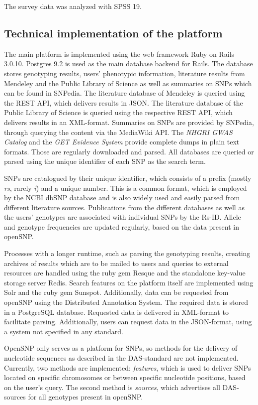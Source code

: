 \documentclass[10pt]{article}
\begin{document}
The survey data was analyzed with SPSS 19. 

\subsection*{Technical implementation of the platform}
The main platform is implemented using the web framework Ruby on Rails 3.0.10. Postgres 9.2 is used as the main database backend for Rails. 
The database stores genotyping results, users' phenotypic information, literature results from Mendeley and the Public Library of Science as well as summaries on SNPs 
which can be found in SNPedia. The literature database of Mendeley is queried using the REST API, which delivers results in JSON. The literature database of 
the Public Library of Science is queried using the respective REST API, which delivers results in an XML-format. Summaries on SNPs are provided by SNPedia, 
through querying the content via the MediaWiki API. The \emph{NHGRI GWAS Catalog} and the \emph{GET Evidence System} provide complete dumps in plain text formats. Those are regularly downloaded and parsed. All databases are queried or parsed using the unique identifier of each SNP as the search term. 

SNPs are catalogued by their unique identifier, which consists of a prefix (mostly \textit{rs}, rarely \textit{i}) and a unique number. This is a common format, 
which is employed by the NCBI dbSNP database \cite{Sherry2001} and is also widely used and easily parsed from different literature sources. Publications from the different databases as 
well as the users' genotypes are associated with individual SNPs by the Rs-ID. Allele and genotype frequencies are updated regularly, based on the data present in openSNP. 

Processes with a longer runtime, such as parsing the genotyping results, creating archives of results which are to be mailed to users and queries to external resources 
are handled using the ruby gem Resque and the standalone key-value storage server Redis. Search features on the platform itself are implemented using Solr and the ruby gem Sunspot. 
Additionally, data can be requested from openSNP using the Distributed Annotation System. The required data is stored in a PostgreSQL database.  
Requested data is delivered in XML-format to facilitate parsing. Additionally, users can request data in the JSON-format, using a system not specified in any standard.

OpenSNP only serves as a platform for SNPs, so methods for the delivery of nucleotide sequences as described in the DAS-standard are not implemented. Currently, 
two methods are implemented: \textit{features}, which is used to deliver SNPs located on specific chromosomes or between specific nucleotide positions, 
based on the user's query. The second method is \textit{sources}, which advertises all DAS-sources for all genotypes present in openSNP.
\end{document}
